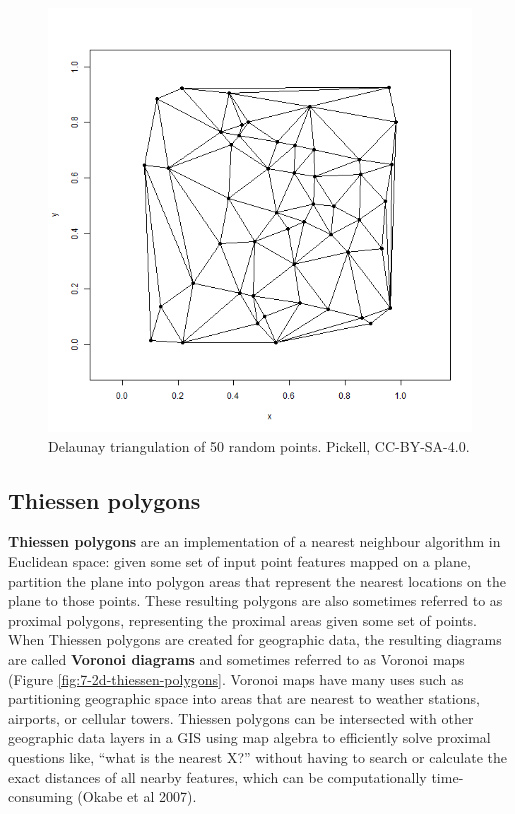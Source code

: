 \documentclass[
]{book}
\begin{document}
\begin{figure}
\includegraphics[width=0.75\linewidth]{images/07-delaunay-triangulation} \caption{Delaunay triangulation of 50 random points. Pickell, CC-BY-SA-4.0.}\label{fig:7-delaunay-triangulation}
\end{figure}

\hypertarget{thiessen-polygons-1}{%
\subsection{Thiessen polygons}\label{thiessen-polygons-1}}

\textbf{Thiessen polygons} are an implementation of a nearest neighbour algorithm in Euclidean space: given some set of input point features mapped on a plane, partition the plane into polygon areas that represent the nearest locations on the plane to those points. These resulting polygons are also sometimes referred to as proximal polygons, representing the proximal areas given some set of points. When Thiessen polygons are created for geographic data, the resulting diagrams are called \textbf{Voronoi diagrams} and sometimes referred to as Voronoi maps (Figure \ref{fig:7-2d-thiessen-polygons}. Voronoi maps have many uses such as partitioning geographic space into areas that are nearest to weather stations, airports, or cellular towers. Thiessen polygons can be intersected with other geographic data layers in a GIS using map algebra to efficiently solve proximal questions like, ``what is the nearest X?'' without having to search or calculate the exact distances of all nearby features, which can be computationally time-consuming (Okabe et al 2007).
\end{document}
